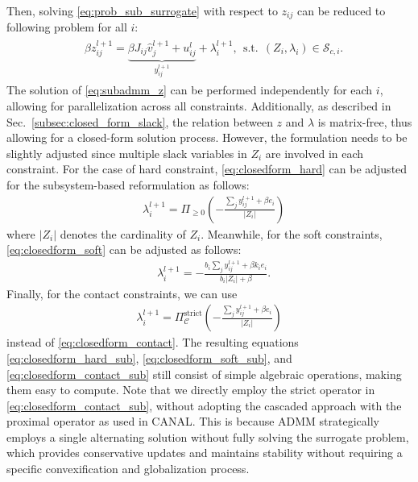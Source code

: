 \documentclass[lettersize,journal]{IEEEtran}
\begin{document}
Then, solving \eqref{eq:prob_sub_surrogate} with respect to $z_{ij}$ can be reduced to following problem for all $i$:
\begin{align} \label{eq:subadmm_z}
\begin{split}
    &\beta z_{ij}^{l+1} = \underbrace{\beta J_{ij}\hat{v}_j^{l+1} +u_{ij}^l}_{y_{ij}^{l+1}} + \lambda_i^{l+1}, ~~\text{s.t.}~~ (Z_i,\lambda_i) \in \mathcal{S}_{c,i}.
\end{split}
\end{align}
The solution of \eqref{eq:subadmm_z} can be performed independently for each $i$, allowing for parallelization across all constraints. 
Additionally, as described in Sec.~\ref{subsec:closed_form_slack}, the relation between $z$ and $\lambda$ is matrix-free, thus allowing for a closed-form solution process. However, the formulation needs to be slightly adjusted since multiple slack variables in $Z_i$ are involved in each constraint. 
For the case of hard constraint, \eqref{eq:closedform_hard} can be adjusted for the subsystem-based reformulation as follows:
\begin{align} \label{eq:closedform_hard_sub}
    &\lambda_i^{l+1} = \Pi_{\ge 0}\left (-\frac{\sum_{j} y_{ij}^{l+1} + \beta e_i}{\vert Z_i \vert}  \right)
\end{align}
where $\vert Z_i \vert$ denotes the cardinality of $Z_i$. 
Meanwhile, for the soft constraints, \eqref{eq:closedform_soft} can be adjusted as follows:
\begin{align} \label{eq:closedform_soft_sub}
    &\lambda_i^{l+1} = -\frac{b_i\sum_{j} y_{ij}^{l+1} + \beta k_ie_i}{b_i\vert Z_i\vert + \beta}.
\end{align}
Finally, for the contact constraints, we can use
\begin{align} \label{eq:closedform_contact_sub}
    \lambda_i^{l+1} = \Pi_{\mathcal{C}}^\text{strict} \left (-\frac{\sum_{j} y_{ij}^{l+1} + \beta e_i}{\vert Z_i \vert}  \right)
\end{align}
instead of \eqref{eq:closedform_contact}.
The resulting equations \eqref{eq:closedform_hard_sub}, \eqref{eq:closedform_soft_sub}, and \eqref{eq:closedform_contact_sub} still consist of simple algebraic operations, making them easy to compute.
Note that we directly employ the strict operator in \eqref{eq:closedform_contact_sub}, without adopting the cascaded approach with the proximal operator as used in CANAL. 
This is because ADMM strategically employs a single alternating solution without fully solving the surrogate problem, which provides conservative updates and maintains stability without requiring a specific convexification and globalization process.
\end{document}
